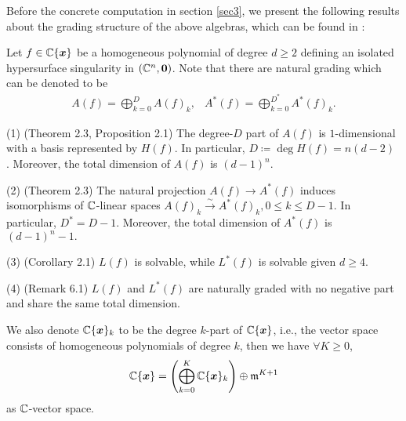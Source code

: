 Before the concrete computation in section \ref{sec3}, we present the following results about the grading structure of the above algebras, which can be found in \cite{BN}:	
\begin{proposition}[\cite{BN}]\label{res}
  Let $f\in {\mathbb{C}}\{{\boldsymbol{x}}\}$ be a homogeneous polynomial of degree $d\geqslant 2$ defining an isolated hypersurface singularity in $( {\mathbb{C}}^n, {\boldsymbol 0})$.
  Note that there are natural grading which can be denoted to be 
  \begin{align*}
    A(f)=\bigoplus_{k=0}^DA(f)_k,&
    A^*(f)=\bigoplus_{k=0}^{D^*}A^*(f)_k.
  \end{align*}
  \item[(1)](Theorem 2.3, Proposition 2.1)  The degree-$D$ part of $A(f)$ is $1$-dimensional with a basis represented by $H(f)$. In particular, $D\coloneq  \deg  H(f) = n(d-2)$ . Moreover, the total dimension of $A(f)$ is  $ (d-1)^n.$
  \item[(2)](Theorem 2.3) The natural projection $A(f) \to A^*(f)$ induces isomorphisms of ${\mathbb{C}}$-linear spaces $A(f)_k\stackrel \sim \to A^*(f)_k, 0 \leqslant k \leqslant D-1$. In particular, $D^*=D-1$. Moreover, the total dimension of $A^*(f)$ is  $ (d-1)^n-1.$
  \item[(3)](Corollary 2.1) $L(f)$  is solvable, while $L^*(f)$ is solvable given $d\geqslant 4$.
  \item[(4)](Remark 6.1) $L(f)$ and $L^*(f)$ are naturally graded with no negative part and share the same total dimension.
  \end{proposition}
  We also denote ${\mathbb{C}}\{{\boldsymbol{x}}\}_k$ to be  the degree $k$-part of ${\mathbb{C}}\{{\boldsymbol{x}}\}$, i.e., the vector space consists of homogeneous polynomials of degree $k$, then we have $\forall K \geqslant 0$, 
  \[{\mathbb{C}}\{{\boldsymbol{x}}\} = \left( \bigoplus_{k=0}^K {\mathbb{C}}\{{\boldsymbol{x}}\}_k \right)\oplus \mathfrak m^{K+1}\]
  as ${\mathbb{C}}$-vector space.

